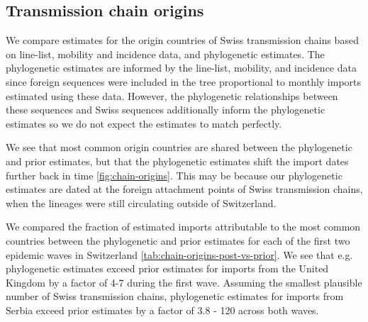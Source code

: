 \documentclass[9pt,twocolumn,twoside,lineno]{pnas-new}
\begin{document}
\subsection{Transmission chain origins}
We compare estimates for the origin countries of Swiss transmission chains based on line-list, mobility and incidence data, and phylogenetic estimates. The phylogenetic estimates are informed by the line-list, mobility, and incidence data since foreign sequences were included in the tree proportional to monthly imports estimated using these data. However, the phylogenetic relationships between these sequences and Swiss sequences additionally inform the phylogenetic estimates so we do not expect the estimates to match perfectly. 

We see that most common origin countries are shared between the phylogenetic and prior estimates, but that the phylogenetic estimates shift the import dates further back in time \ref{fig:chain-origins}. This may be because our phylogenetic estimates are dated at the foreign attachment points of Swiss transmission chains, when the lineages were still circulating outside of Switzerland.

We compared the fraction of estimated imports attributable to the most common countries between the phylogenetic and prior estimates for each of the first two epidemic waves in Switzerland \ref{tab:chain-origins-post-vs-prior}. We see that e.g. phylogenetic estimates exceed prior estimates for imports from the United Kingdom by a factor of 4-7 during the first wave. Assuming the smallest plausible number of Swiss transmission chains, phylogenetic estimates for imports from Serbia exceed prior estimates by a factor of 3.8 - 120 across both waves.
\end{document}
